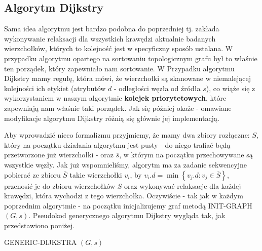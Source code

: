 \subsection{Algorytm Dijkstry}

Sama idea algorytmu jest bardzo podobna do poprzedniej tj. zakłada wykonywanie relaksacji dla wszystkich krawędzi aktualnie badanych wierzchołków, których to kolejność jest w specyficzny sposób ustalana. W przypadku algorytmu opartego na sortowaniu topologicznym grafu był to właśnie ten porządek, który zapewniało nam sortowanie. W Przypadku algorytmu Dijkstry mamy regułę, która mówi, że wierzchołki są skanowane w niemalejącej kolejności ich etykiet (atrybutów $d$ - odległości węzła od źródła $s$), co wiąże się z wykorzystaniem w naszym algorytmie \textbf{kolejek priorytetowych}, które zapewniają nam właśnie taki porządek. Jak się później okaże - omawiane modyfikacje algorytmu Dijkstry różnią się głównie jej implementacją.

Aby wprowadzić nieco formalizmu przyjmiemy, że mamy dwa zbiory rozłączne: $S$, który na początku działania algorytmu jest pusty - do niego trafiać będą przetworzone już wierzchołki - oraz $\overline{s}$, w którym na początku przechowywane są wszystkie węzły. Jak już wspomnieliśmy, algorytm ma za zadanie sekwencyjne pobierać ze zbioru $\overline{S}$ takie wierzchołki $v_{i}$, by $v_{i}.d = \min \left\{ v_{j}.d : v_{j} \in \overline{S} \right\}$, przenosić je do zbioru wierzchołków $S$ oraz wykonywać relaksacje dla każdej krawędzi, która wychodzi z tego wierzchołka. Oczywiście - tak jak w każdym poprzednim algorytmie - na początku inicjalizujemy graf metodą \textsc{INIT-GRAPH} $\left( G, s \right)$. Pseudokod generycznego algorytmu Dijkstry wygląda tak, jak przedstawiono poniżej.

\begin{algorithm}[!htbp]
\DontPrintSemicolon
{}
\caption{ GENERIC-DIJKSTRA $\left( G, s \right)$\label{alg:GenericDijksta}}
\end{algorithm}

